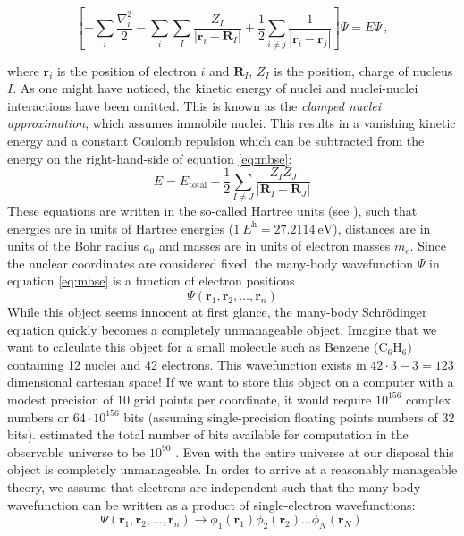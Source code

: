 \begin{equation}\label{eq:mbse}
	\left[ -\sum_i \frac{\nabla_i^2}{2} - \sum_{i} \sum_{I} \frac{Z_I}{|\bm{r}_i - \bm{R}_I|} + \frac{1}{2} \sum_{i \neq j} \frac{1}{|\bm{r}_i - \bm{r}_j|} \right] \Psi = E \Psi \, ,
\end{equation}

\noindent where $\bm{r}_i$ is the position of electron $i$ and $\bm{R}_I$, $Z_I$ is the position, charge of nucleus $I$. As one might have noticed, the kinetic energy of nuclei and nuclei-nuclei interactions have been omitted. This is known as the \emph{clamped nuclei approximation}, which assumes immobile nuclei. This results in a vanishing kinetic energy and a constant Coulomb repulsion which can be subtracted from the energy on the right-hand-side of equation \eqref{eq:mbse}:
%
\[ E = E_\text{total} - \frac{1}{2} \sum_{I \neq J} \frac{Z_I Z_J}{|\bm{R}_I - \bm{R}_J|} \]
%
These equations are written in the so-called Hartree units (see \cite[chapter 2.3]{Giustino2014}), such that energies are in units of Hartree energies ($\SI{1}{\hartree} = \SI{27.2114}{\eV}$), distances are in units of the Bohr radius $a_0$ and masses are in units of electron masses $m_e$. Since the nuclear coordinates are considered fixed, the many-body wavefunction $\Psi$ in equation \eqref{eq:mbse} is a function of electron positions
%
\[ \Psi(\bm{r}_1,\bm{r}_2,\dots, \bm{r}_n) \]
%
While this object seems innocent at first glance, the many-body Schr\"odinger equation quickly becomes a completely unmanageable object. Imagine that we want to calculate this object for a small molecule such as Benzene (C$_6$H$_6$) containing 12 nuclei and 42 electrons. This wavefunction exists in $42\cdot3-3 = 123$ dimensional cartesian space! If we want to store this object on a computer with a modest precision of 10 grid points per coordinate, it would require $10^{156}$ complex numbers or $64 \cdot 10^{156}$ bits (assuming single-precision floating points numbers of 32 bits). \citeauthor{Lloyd2002} estimated the total number of bits available for computation in the observable universe to be $10^{90}$ \cite{Lloyd2002}. Even with the entire universe at our disposal this object is completely unmanageable. In order to arrive at a reasonably manageable theory, we assume that electrons are independent such that the many-body wavefunction can be written as a product of single-electron wavefunctions:
%
\begin{equation}\label{eq:independent_electrons}
\Psi(\bm{r}_1,\bm{r}_2,\dots, \bm{r}_n) \longrightarrow \phi_1(\bm{r}_1)\phi_2(\bm{r}_2)\dots\phi_N(\bm{r}_N) \,
\end{equation}
